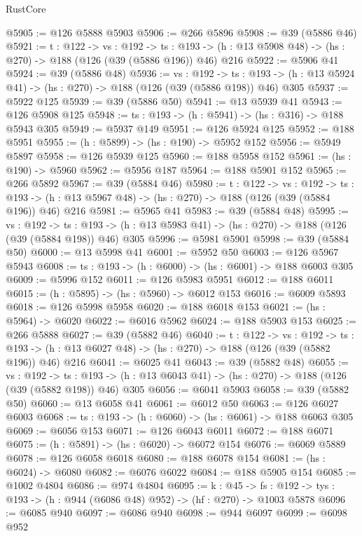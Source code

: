 \begin{lexlean}{RustCore}
\begin{coremodule}
@5905 := @126 @5888 @5903
@5906 := @266 @5896
@5908 := @39 (@5886 @46)
@5921 := {t : @122} ->
  {vs : @192} ->
  {ts : @193} -> (h : @13 @5908 @48) -> (hs : @270) -> @188 (@126 (@39 (@5886 @196)) @46) @216
@5922 := @5906 @41
@5924 := @39 (@5886 @48)
@5936 := {vs : @192} ->
  {ts : @193} -> (h : @13 @5924 @41) -> (hs : @270) -> @188 (@126 (@39 (@5886 @198)) @46) @305
@5937 := @5922 @125
@5939 := @39 (@5886 @50)
@5941 := @13 @5939 @41
@5943 := @126 @5908 @125
@5948 := {ts : @193} -> (h : @5941) -> (hs : @316) -> @188 @5943 @305
@5949 := @5937 @149
@5951 := @126 @5924 @125
@5952 := @188 @5951
@5955 := (h : @5899) -> (hs : @190) -> @5952 @152
@5956 := @5949 @5897
@5958 := @126 @5939 @125
@5960 := @188 @5958 @152
@5961 := (hs : @190) -> @5960
@5962 := @5956 @187
@5964 := @188 @5901 @152
@5965 := @266 @5892
@5967 := @39 (@5884 @46)
@5980 := {t : @122} ->
  {vs : @192} ->
  {ts : @193} -> (h : @13 @5967 @48) -> (hs : @270) -> @188 (@126 (@39 (@5884 @196)) @46) @216
@5981 := @5965 @41
@5983 := @39 (@5884 @48)
@5995 := {vs : @192} ->
  {ts : @193} -> (h : @13 @5983 @41) -> (hs : @270) -> @188 (@126 (@39 (@5884 @198)) @46) @305
@5996 := @5981 @5901
@5998 := @39 (@5884 @50)
@6000 := @13 @5998 @41
@6001 := @5952 @50
@6003 := @126 @5967 @5943
@6008 := {ts : @193} -> (h : @6000) -> (hs : @6001) -> @188 @6003 @305
@6009 := @5996 @152
@6011 := @126 @5983 @5951
@6012 := @188 @6011
@6015 := (h : @5895) -> (hs : @5960) -> @6012 @153
@6016 := @6009 @5893
@6018 := @126 @5998 @5958
@6020 := @188 @6018 @153
@6021 := (hs : @5964) -> @6020
@6022 := @6016 @5962
@6024 := @188 @5903 @153
@6025 := @266 @5888
@6027 := @39 (@5882 @46)
@6040 := {t : @122} ->
  {vs : @192} ->
  {ts : @193} -> (h : @13 @6027 @48) -> (hs : @270) -> @188 (@126 (@39 (@5882 @196)) @46) @216
@6041 := @6025 @41
@6043 := @39 (@5882 @48)
@6055 := {vs : @192} ->
  {ts : @193} -> (h : @13 @6043 @41) -> (hs : @270) -> @188 (@126 (@39 (@5882 @198)) @46) @305
@6056 := @6041 @5903
@6058 := @39 (@5882 @50)
@6060 := @13 @6058 @41
@6061 := @6012 @50
@6063 := @126 @6027 @6003
@6068 := {ts : @193} -> (h : @6060) -> (hs : @6061) -> @188 @6063 @305
@6069 := @6056 @153
@6071 := @126 @6043 @6011
@6072 := @188 @6071
@6075 := (h : @5891) -> (hs : @6020) -> @6072 @154
@6076 := @6069 @5889
@6078 := @126 @6058 @6018
@6080 := @188 @6078 @154
@6081 := (hs : @6024) -> @6080
@6082 := @6076 @6022
@6084 := @188 @5905 @154
@6085 := @1002 @4804
@6086 := @974 @4804
@6095 := {k : @45} ->
  {fs : @192} -> {tys : @193} -> (h : @944 (@6086 @48) @952) -> (hf : @270) -> @1003 @5878
@6096 := @6085 @940
@6097 := @6086 @940
@6098 := @944 @6097
@6099 := @6098 @952

\end{coremodule}
\end{lexlean}
